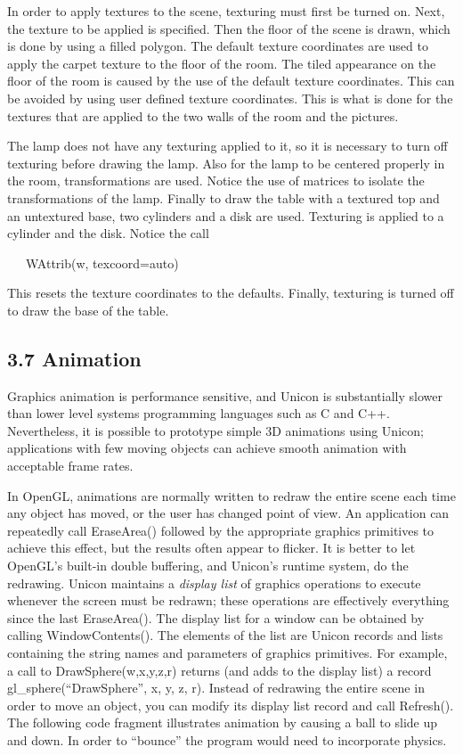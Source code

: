 \documentclass[letterpaper]{article}
\begin{document}
\bigskip

In order to apply textures to the scene, texturing must first be
turned on. Next, the texture to be applied is specified. Then the
floor of the scene is drawn, which is done by using a filled
polygon. The default texture coordinates are used to apply the carpet
texture to the floor of the room. The tiled appearance on the floor of
the room is caused by the use of the default texture coordinates. This
can be avoided by using user defined texture coordinates. This is what
is done for the textures that are applied to the two walls of the room
and the pictures.

The lamp does not have any texturing applied to it, so it is necessary
to turn off texturing before drawing the lamp.  Also for the lamp to
be centered properly in the room, transformations are used. Notice the
use of matrices to isolate the transformations of the lamp. Finally to
draw the table with a textured top and an untextured base, two
cylinders and a disk are used. Texturing is applied to a cylinder and
the disk. Notice the call

{
\ \ \ \textsf{WAttrib(w, {\textquotedbl}texcoord=auto{\textquotedbl})}}

This resets the texture coordinates to the defaults. Finally,
texturing is turned off to draw the base of the table.


\subsection[3.7 Animation]{3.7 Animation}

Graphics animation is performance sensitive, and Unicon is
substantially slower than lower level systems programming languages
such as C and C++. Nevertheless, it is possible to prototype simple 3D
animations using Unicon; applications with few moving objects can
achieve smooth animation with acceptable frame rates.

In OpenGL, animations are normally written to redraw the entire scene
each time any object has moved, or the user has changed point of
view. An application can repeatedly call \textsf{EraseArea()}
followed by the
appropriate graphics primitives to achieve this effect, but the
results often appear to flicker. It is better to let OpenGL's built-in
double buffering, and Unicon's runtime system, do the
redrawing. Unicon maintains a \textit{display list} of graphics
operations to execute whenever the screen must be redrawn; these
operations are effectively everything since the last EraseArea(). The
display list for a window can be obtained by calling
WindowContents(). The elements of the list are Unicon records and
lists containing the string names and parameters of graphics
primitives. For example, a call to \textsf{DrawSphere(w,x,y,z,r)}
returns (and adds to the display list) a record
gl\_sphere(``DrawSphere'', x, y, z, r). Instead of redrawing the
entire scene in order to move an object,
you can modify its display list record and call \textsf{Refresh()}.  The
following code fragment illustrates animation by causing a ball to
slide up and down. In order to ``bounce'' the program would need to
incorporate physics.
\end{document}
